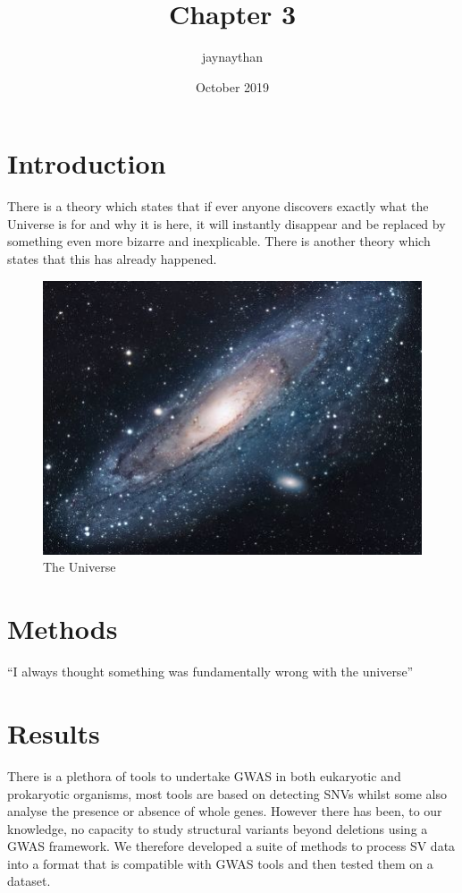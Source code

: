 \documentclass{article}
\title{Chapter 3}
\author{jaynaythan }
\date{October 2019}
\begin{document}
\maketitle

\section{Introduction}
There is a theory which states that if ever anyone discovers exactly what the Universe is for and why it is here, it will instantly disappear and be replaced by something even more bizarre and inexplicable.
There is another theory which states that this has already happened.

\begin{figure}[h!]
\centering
\includegraphics[scale=1.7]{universe}
\caption{The Universe}
\label{fig:universe}
\end{figure}

\section{Methods}
``I always thought something was fundamentally wrong with the universe'' \citep{adams1995hitchhiker}
\section{Results}

There is a plethora of tools to undertake GWAS in both eukaryotic and prokaryotic organisms, most tools are based on detecting SNVs whilst some also analyse the presence or absence of whole genes. However there has been, to our knowledge, no capacity to study structural variants beyond deletions using a GWAS framework. We therefore developed a suite of methods to process SV data into a format that is compatible with GWAS tools and then tested them on a dataset.
\end{document}
